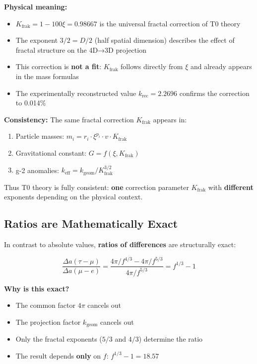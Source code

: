 	\textbf{Physical meaning:}
	\begin{itemize}
		\item $K_\text{frak} = 1 - 100\xi = 0.98667$ is the universal fractal correction of T0 theory
		\item The exponent $3/2 = D/2$ (half spatial dimension) describes the effect of fractal structure on the 4D→3D projection
		\item This correction is \textbf{not a fit}: $K_\text{frak}$ follows directly from $\xi$ and already appears in the mass formulas
		\item The experimentally reconstructed value $k_\text{rec} = 2.2696$ confirms the correction to 0.014\%
	\end{itemize}
	
	\textbf{Consistency:} The same fractal correction $K_\text{frak}$ appears in:
	\begin{enumerate}
		\item Particle masses: $m_i = r_i \cdot \xi^{p_i} \cdot v \cdot K_\text{frak}$
		\item Gravitational constant: $G = f(\xi, K_\text{frak})$
		\item g-2 anomalies: $k_\text{eff} = k_\text{geom} / K_\text{frak}^{3/2}$
	\end{enumerate}
	
	Thus T0 theory is fully consistent: \textbf{one} correction parameter $K_\text{frak}$ with \textbf{different} exponents depending on the physical context.
	
	\subsection{Ratios are Mathematically Exact}
	
	In contrast to absolute values, \textbf{ratios of differences} are structurally exact:
	
	\begin{equation}
		\frac{\Delta a(\tau - \mu)}{\Delta a(\mu - e)} = \frac{4\pi/f^{4/3} - 4\pi/f^{5/3}}{4\pi/f^{5/3}} = f^{1/3} - 1
	\end{equation}
	
	\textbf{Why is this exact?}
	
	\begin{itemize}
		\item The common factor $4\pi$ cancels out
		\item The projection factor $k_{\text{geom}}$ cancels out
		\item Only the fractal exponents ($5/3$ and $4/3$) determine the ratio
		\item The result depends \textbf{only} on $f$: $f^{1/3} - 1 = 18.57$
	\end{itemize}
	
